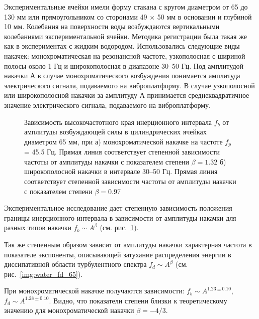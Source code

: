 Экспериментальные ячейки имели форму стакана с кругом диаметром от 65 до 130 мм или прямоугольником со сторонами 49 $\times$ 50 мм в основании и глубиной 10 мм. Колебания на поверхности воды возбуждаются вертикальными колебаниями экспериментальной ячейки. Методика регистрации была такая же как в экспериментах с жидким водородом. Использовались следующие виды накачек: монохроматическая на резонансной частоте, узкополосная с шириной полосы около 1 Гц и широкополосная в диапазоне 30–50 Гц. Под амплитудой накачки А в случае монохроматического возбуждения понимается амплитуда электрического сигнала, подаваемого на виброплатформу. В случае узкополосной или широкополосной накачки за амплитуду А принимается среднеквадратичное значение электрического сигнала, подаваемого на виброплатформу.

\begin{figure}[ht]
 \begin{minipage}[ht]{0.49\linewidth}
 \end{minipage}
 \hfill
 \begin{minipage}[ht]{0.49\linewidth}
 \end{minipage}
 \caption{Зависимость высокочастотного края инерционного интервала $f_b$ от амплитуды возбуждающей силы в цилиндрических ячейках диаметром 65 мм, при а) монохроматической накачке на частоте $f_p$ = 45.5 Гц. Прямая линия соответствует степенной зависимости частоты от амплитуды накачки с показателем степени $\beta = 1.32$
 б) широкополосной накачки в интервале 30–50 Гц. Прямая линия соответствует степенной зависимости частоты от амплитуды накачки с показателем степени $\beta = 0.97$}

 \label{img:water_fb_65} 
\end{figure}
Экспериментальное исследование дает степенную зависимость положения границы инерционного интервала в зависимости от амплитуды накачки для разных типов накачки $f_b \sim A^\beta$ (см. рис.~\ref{img:water_fb_65}).

 Так же степенным образом зависит от амплитуды накачки характерная частота в показателе экспоненты, описывающей затухание распределения энергии в диссипативной области турбулентного спектра $f_d \sim A^\beta$ (см. рис.~\ref{img:water_fd_65}).



При монохроматической накачке получаются зависимости: $f_b \sim A^{1.23 \pm 0.10}$,  $f_d \sim A^{1.28 \pm 0.10}$. Видно, что показатели степени близки к теоретическому значению для монохроматической накачки $\beta = -4/3$.

